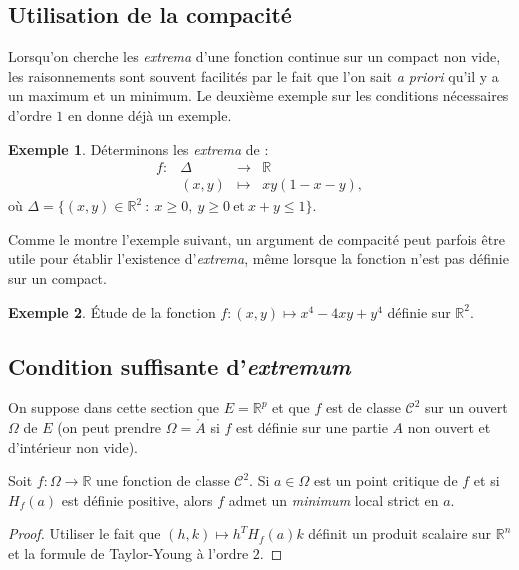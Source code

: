 \documentclass[french]{article}
\newcommand{\R}{\mathbb{R}}
\theoremstyle{plain}
\theoremstyle{definition}
\newtheorem*{ex}{Exemple}
\theoremstyle{remark}
\begin{document}
\subsection{Utilisation de la compacité}

Lorsqu'on cherche les \textit{extrema} d'une fonction continue sur un compact non vide, les raisonnements sont souvent facilités par le fait que l'on sait \textit{a priori} qu'il y a un maximum et un minimum. Le deuxième exemple sur les conditions nécessaires d'ordre $1$ en donne déjà un exemple.

\begin{ex}
	Déterminons les \textit{extrema} de :
	$$\begin{array}{lrcl}
		f:&\Delta&\longrightarrow&\R\\
		&(x,y)&\longmapsto&xy(1-x-y),
	\end{array}$$ où $\Delta=\{(x,y)\in\R^2\ :\ x\geqslant0,\ y\geqslant0\ \text{et}\ x+y\leqslant 1\}$.
\end{ex}

Comme le montre l'exemple suivant, un argument de compacité peut parfois être utile pour établir l'existence d'\textit{extrema}, même lorsque la fonction n'est pas définie sur un compact.

\begin{ex}
	Étude de la fonction $f:(x,y)\mapsto x^4-4xy+y^4$ définie sur $\R^2$.
\end{ex}

\subsection{Condition suffisante d'\textit{extremum}}

On suppose dans cette section que $E=\R^p$ et que $f$ est de classe $\mathcal{C}^2$ sur un ouvert $\Omega$ de $E$ (on peut prendre $\Omega=\mathring{A}$ si $f$ est définie sur une partie $A$ non ouvert et d'intérieur non vide).

\begin{prop}%
	Soit $f:\Omega\to\R$ une fonction de classe $\mathcal{C}^2$. Si $a\in\Omega$ est un point critique de $f$ et si $H_f(a)$ est définie positive, alors $f$ admet un \textit{minimum} local strict en $a$.
\end{prop}
\begin{proof}
	Utiliser le fait que $(h,k)\mapsto h^T H_f(a)k$ définit un produit scalaire sur $\R^n$ et la formule de Taylor-Young à l'ordre $2$.
\end{proof}
\end{document}
